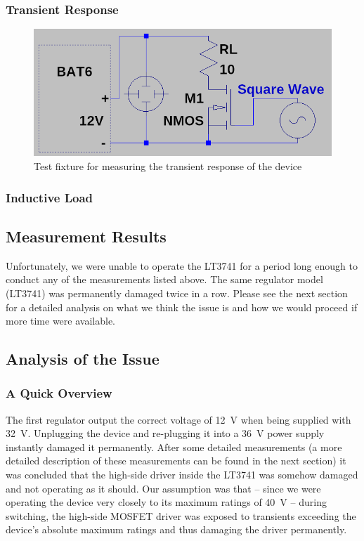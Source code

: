 \subsubsection{Transient Response}

\begin{figure}[th!]
    \centering
    \includegraphics[width=.6\textwidth]{images/sim/transient-fixture.png}
    \caption{Test fixture for measuring the transient response of the device}
    \label{fig:verification:transient_fix}
\end{figure}


\subsubsection{Inductive Load}


\subsection{Measurement Results}

Unfortunately, we were unable to  operate the LT3741 for a period long enough to
conduct any of the measurements listed above.  The same regulator model (LT3741)
was  permanently  damaged  twice  in  a row. Please see the next section  for  a
detailed analysis on what we think the issue is and how we would proceed if more
time were available.


\subsection{Analysis of the Issue}

\subsubsection{A Quick Overview}

The first regulator output the  correct  voltage  of  \SI{12}{\volt}  when being
supplied with \SI{32}{\volt}.  Unplugging  the  device and re-plugging it into a
\SI{36}{\volt}  power  supply  instantly  damaged  it  permanently.  After  some
detailed measurements (a more detailed description of  these measurements can be
found in the next section) it was concluded that the high-side driver inside the
LT3741 was somehow damaged  and  not  operating as it should. Our assumption was
that -- since we were operating the device very  closely  to its maximum ratings
of  \SI{40}{\volt} -- during switching, the high-side MOSFET driver was  exposed
to transients exceeding the device's absolute maximum  ratings and thus damaging
the driver permanently.

